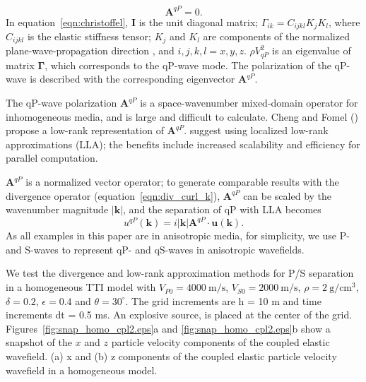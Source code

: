 \documentclass[manuscript,ulem,graphix,revised]{geophysics}
\begin{document}
\begin{equation}
[\boldsymbol{\Gamma}-\rho V_{qP}^2\boldsymbol{I}]\boldsymbol{A}^{qP}=0.
\label{eqn:christoffel}
\end{equation}
In equation~\ref{eqn:christoffel}, $\boldsymbol{I}$ is the unit diagonal matrix; $\Gamma_{ik}=C_{ijkl}K_jK_l$, where $C_{ijkl}$ is the elastic stiffness tensor; $K_j$ and $K_l$ are components of the normalized plane-wave-propagation direction \citep{zhang10}, and $i,j,k,l = x,y,z$. $\rho V_{qP}^2$ is an eigenvalue of matrix $\boldsymbol{\Gamma}$, which corresponds to the qP-wave mode. The polarization of the qP-wave is described with the corresponding eigenvector $\boldsymbol{A}^{qP}$. 

The qP-wave polarization $\boldsymbol{A}^{qP}$ is a space-wavenumber mixed-domain operator for inhomogeneous media, and is large and difficult to calculate. Cheng and Fomel (\citeyear{cheng14}) propose a low-rank representation of $\boldsymbol{A}^{qP}$.
\citet{wenlong18} suggest using localized low-rank approximations (LLA); the benefits include increased scalability and efficiency for parallel computation.  

$\boldsymbol{A}^{qP}$ is a normalized vector operator; to generate comparable results with the divergence operator (equation~\ref{eqn:div_curl_k}), $\boldsymbol{A}^{qP}$ can be scaled by the wavenumber magnitude $|\boldsymbol{k}|$, and the separation of qP with LLA becomes 
\begin{equation}
u^{qP}(\boldsymbol{k})=i|\boldsymbol{k}|\boldsymbol{A}^{qP} \cdot \boldsymbol{u}(\boldsymbol{k}).
\label{eqn:div_curl_ak1}
\end{equation}
As all examples in this paper are in anisotropic media, for simplicity, we use P- and S-waves to represent qP- and qS-waves in anisotropic wavefields.

We test the divergence and low-rank approximation methods for P/S separation in a homogeneous TTI model with $V_{P0}=4000~\mathrm{m/s}$, $V_{S0}=2000~\mathrm{m/s}$, $\rho=2~\mathrm{g/cm^3}$, $\delta=0.2$, $\epsilon=0.4$ and $\theta=30^\circ$. 
The grid increments are h = 10 m and time increments dt = 0.5 ms. 
An explosive source, is placed at the center of the grid. 
Figures~\ref{fig:snap_homo_cpl2.eps}a and \ref{fig:snap_homo_cpl2.eps}b show a snapshot of the $x$ and $z$ particle velocity components of the coupled elastic wavefield.
{
(a) x and (b) z components of the coupled elastic particle velocity wavefield in a homogeneous model.
}
\end{document}
